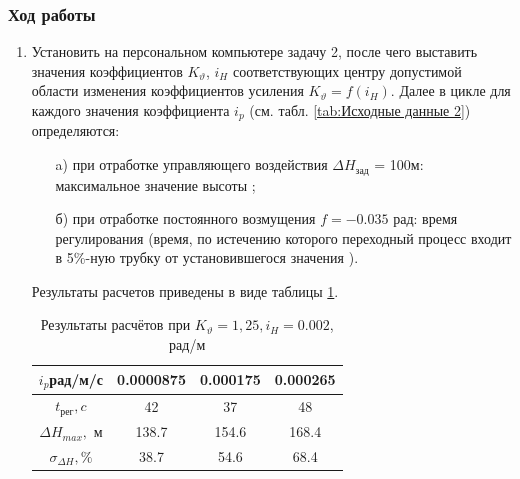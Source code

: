 \documentclass[a4paper,12pt]{article}
\begin{document}
        \subsubsection{Ход работы}
            	\begin{enumerate}
		            \item Установить на персональном компьютере задачу 2, после чего выставить
                        значения коэффициентов $K_{\vartheta}$, $i_H$ соответствующих центру допустимой
                        области изменения коэффициентов усиления $K_{\vartheta}=f(i_H)$. Далее в цикле для
                        каждого значения коэффициента  $i_p$ (см. табл. \ref{tab:Исходные данные 2}) определяются:
                            \begin{itemize}
                                \item[a)] при отработке управляющего воздействия $\Delta H_{зад}$ = 100м:
                                        максимальное значение высоты ;
                                \item[б)] при отработке постоянного возмущения  $f=-0.035$ рад:
                                время регулирования   (время, по истечению которого переходный процесс  входит в 5\%-ную трубку от установившегося значения
                                ).
                            \end{itemize}
                            Результаты расчетов приведены в виде таблицы \ref{tab:Таблица с результатами лаба2}.
                            
                            \begin{table}[H]
                                \centering
                                \caption{Результаты расчётов при $K_{\vartheta}=1,25, i_H=0.002$, рад/м}
                                \begin{tabular}{|c|c|c|c|}
                                \hline
                                    $i_p$рад/м/с & 0.0000875 & 0.000175 &0.000265\\ \hline
                                    $t_{\text{рег}}, c$ & 42 & 37 &48\\ \hline
                                    $\Delta H_{max},$ м &  138.7  & 154.6 & 168.4 \\ \hline
                                    $\sigma_{\Delta H}, \%$  & 38.7  & 54.6  &  68.4 \\ \hline
                                \end{tabular}
                                \label{tab:Таблица с результатами лаба2}
                            \end{table}
                            

\end{enumerate}
\end{document}

